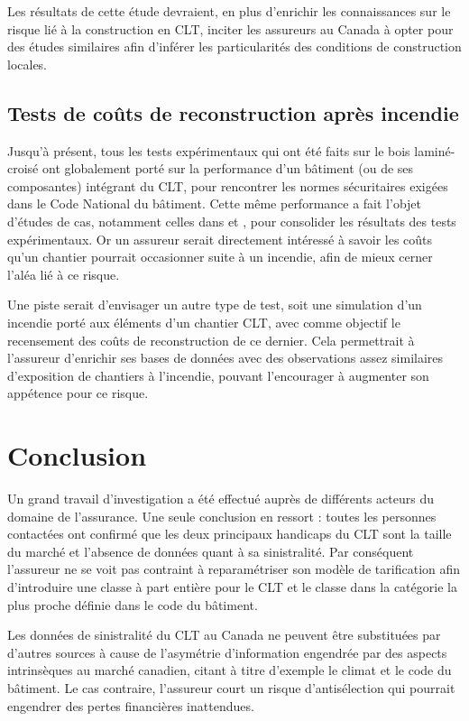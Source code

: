 \documentclass[11pt]{article}
\begin{document}
Les résultats de cette étude devraient, en plus d'enrichir les connaissances sur le risque lié à la construction en CLT, inciter les assureurs au Canada à opter pour des études similaires afin d'inférer les particularités des conditions de construction locales.

\subsection{Tests de coûts de reconstruction après incendie}

Jusqu'à présent, tous les tests expérimentaux qui ont été faits sur le bois laminé-croisé ont globalement porté sur la performance d'un bâtiment (ou de ses composantes) intégrant du CLT, pour rencontrer les normes sécuritaires exigées dans le Code National du bâtiment. Cette même performance a fait l'objet d'études de cas, notamment celles dans \cite{zhang2015case} et \cite{encapsulated}, pour consolider les résultats des tests expérimentaux. Or un assureur serait directement intéressé à savoir les coûts qu'un chantier pourrait occasionner suite à un incendie, afin de mieux cerner l'aléa lié à ce risque.

Une piste serait d'envisager un autre type de test, soit une simulation d'un incendie porté aux éléments d'un chantier CLT, avec comme objectif le recensement des coûts de reconstruction de ce dernier. Cela permettrait à l'assureur d'enrichir ses bases de données avec des observations assez similaires d'exposition de chantiers à l'incendie, pouvant l'encourager à augmenter son appétence pour ce risque.

\section{Conclusion}

Un grand travail d'investigation a été effectué auprès de différents acteurs du domaine de l'assurance. Une seule conclusion en ressort : toutes les personnes contactées ont confirmé que les deux principaux handicaps du CLT sont la taille du marché et l'absence de données quant à sa sinistralité.  Par conséquent l'assureur ne se voit pas contraint à reparamétriser son modèle de tarification afin d'introduire une classe à part entière pour le CLT et le classe dans la catégorie la plus proche définie dans le code du bâtiment.

Les données de sinistralité du CLT au Canada ne peuvent être substituées par d’autres sources à cause de l’asymétrie d’information engendrée par des aspects intrinsèques au marché canadien, citant à titre d’exemple le climat et le code du bâtiment. Le cas contraire, l’assureur court un risque d’antisélection qui pourrait engendrer des pertes financières inattendues.
\end{document}
